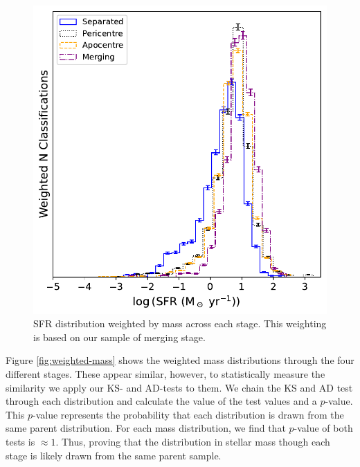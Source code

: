 \begin{figure}
\centering
\includegraphics[width=\textwidth]{Chapter3/figures/sfr_dist.pdf}
\caption[SFR distribution weighted by mass across each stage.]{SFR distribution weighted by mass across each stage. This weighting is based on our sample of merging stage.}
\label{fig:weighted-sfr}
\end{figure}

Figure \ref{fig:weighted-mass} shows the weighted mass distributions through the four different stages. These appear similar, however, to statistically measure the similarity we apply our KS- and AD-tests to them. We chain the KS and AD test through each distribution and calculate the value of the test values and a $p$-value. This $p$-value represents the probability that each distribution is drawn from the same parent distribution. For each mass distribution, we find that $p$-value of both tests is $\approx1$. Thus, proving that the distribution in stellar mass though each stage is likely drawn from the same parent sample. 

